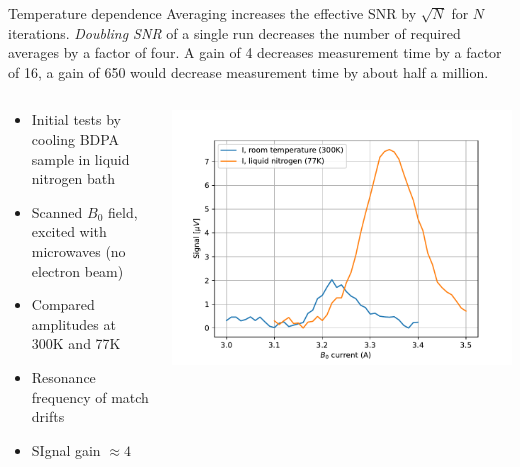 \documentclass[final]{beamer}
\begin{document}
\begin{frame}[fragile]{}
\begin{columns}[T]
\begin{column}{.49\linewidth}
\begin{block}{\Large Temperature dependence}
        Averaging increases the effective SNR by $\sqrt{N}$ for $N$ iterations. \textit{Doubling SNR}
        of a single run decreases the number of required averages by a factor of four. A gain
        of 4 decreases measurement time by a factor of 16, a gain of 650 would decrease
        measurement time by about half a million.

        \begin{columns}
          \begin{column}{0.65\columnwidth}
            \begin{itemize}
              \item Initial tests by cooling BDPA sample in liquid nitrogen bath
              \item Scanned $B_0$ field, excited with microwaves (no electron beam)
              \item Compared amplitudes at 300K and 77K
              \item Resonance frequency of match drifts
              \item SIgnal gain $\approx 4$
            \end{itemize}
          \end{column}
          \begin{column}{0.35\columnwidth}
            \includegraphics[width=\columnwidth]{figures/signals300_77.pdf}
          \end{column}
        \end{columns}
      \end{block}


\end{column}
\end{columns}
\end{frame}
\end{document}
